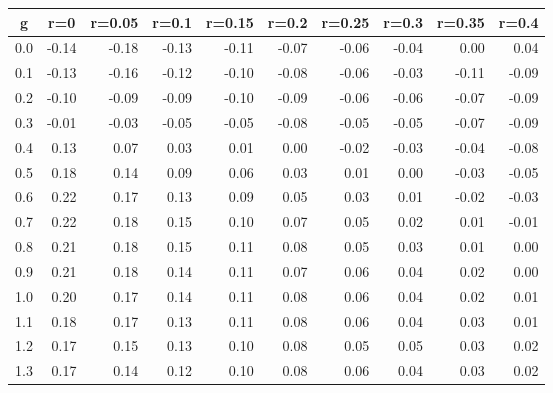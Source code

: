 %
\begin{table}[!tbp]
 \begin{center}
 \begin{tabular}{rrrrrrrrrr}\hline\hline
\multicolumn{1}{c}{g}&\multicolumn{1}{c}{r=0}&\multicolumn{1}{c}{r=0.05}&\multicolumn{1}{c}{r=0.1}&\multicolumn{1}{c}{r=0.15}&\multicolumn{1}{c}{r=0.2}&\multicolumn{1}{c}{r=0.25}&\multicolumn{1}{c}{r=0.3}&\multicolumn{1}{c}{r=0.35}&\multicolumn{1}{c}{r=0.4}\tabularnewline
\hline
0.0&-0.14&-0.18&-0.13&-0.11&-0.07&-0.06&-0.04& 0.00& 0.04\tabularnewline
0.1&-0.13&-0.16&-0.12&-0.10&-0.08&-0.06&-0.03&-0.11&-0.09\tabularnewline
0.2&-0.10&-0.09&-0.09&-0.10&-0.09&-0.06&-0.06&-0.07&-0.09\tabularnewline
0.3&-0.01&-0.03&-0.05&-0.05&-0.08&-0.05&-0.05&-0.07&-0.09\tabularnewline
0.4& 0.13& 0.07& 0.03& 0.01& 0.00&-0.02&-0.03&-0.04&-0.08\tabularnewline
0.5& 0.18& 0.14& 0.09& 0.06& 0.03& 0.01& 0.00&-0.03&-0.05\tabularnewline
0.6& 0.22& 0.17& 0.13& 0.09& 0.05& 0.03& 0.01&-0.02&-0.03\tabularnewline
0.7& 0.22& 0.18& 0.15& 0.10& 0.07& 0.05& 0.02& 0.01&-0.01\tabularnewline
0.8& 0.21& 0.18& 0.15& 0.11& 0.08& 0.05& 0.03& 0.01& 0.00\tabularnewline
0.9& 0.21& 0.18& 0.14& 0.11& 0.07& 0.06& 0.04& 0.02& 0.00\tabularnewline
1.0& 0.20& 0.17& 0.14& 0.11& 0.08& 0.06& 0.04& 0.02& 0.01\tabularnewline
1.1& 0.18& 0.17& 0.13& 0.11& 0.08& 0.06& 0.04& 0.03& 0.01\tabularnewline
1.2& 0.17& 0.15& 0.13& 0.10& 0.08& 0.05& 0.05& 0.03& 0.02\tabularnewline
1.3& 0.17& 0.14& 0.12& 0.10& 0.08& 0.06& 0.04& 0.03& 0.02\tabularnewline
\hline
\end{tabular}

\end{center}

\end{table}

